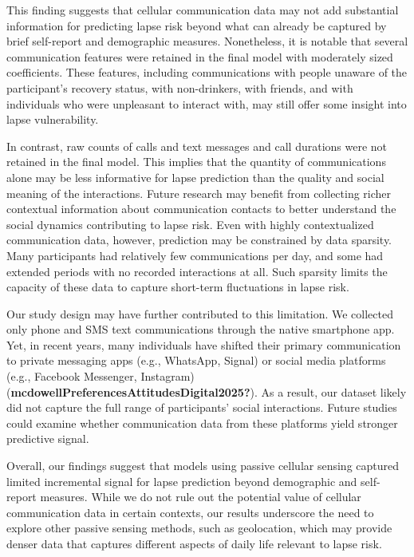 \documentclass[
  letterpaper,
  DIV=11,
  numbers=noendperiod]{scrartcl}
\begin{document}
This finding suggests that cellular communication data may not add
substantial information for predicting lapse risk beyond what can
already be captured by brief self-report and demographic measures.
Nonetheless, it is notable that several communication features were
retained in the final model with moderately sized coefficients. These
features, including communications with people unaware of the
participant's recovery status, with non-drinkers, with friends, and with
individuals who were unpleasant to interact with, may still offer some
insight into lapse vulnerability.

In contrast, raw counts of calls and text messages and call durations
were not retained in the final model. This implies that the quantity of
communications alone may be less informative for lapse prediction than
the quality and social meaning of the interactions. Future research may
benefit from collecting richer contextual information about
communication contacts to better understand the social dynamics
contributing to lapse risk. Even with highly contextualized
communication data, however, prediction may be constrained by data
sparsity. Many participants had relatively few communications per day,
and some had extended periods with no recorded interactions at all. Such
sparsity limits the capacity of these data to capture short-term
fluctuations in lapse risk.

Our study design may have further contributed to this limitation. We
collected only phone and SMS text communications through the native
smartphone app. Yet, in recent years, many individuals have shifted
their primary communication to private messaging apps (e.g., WhatsApp,
Signal) or social media platforms (e.g., Facebook Messenger, Instagram)
(\textbf{mcdowellPreferencesAttitudesDigital2025?}). As a result, our
dataset likely did not capture the full range of participants' social
interactions. Future studies could examine whether communication data
from these platforms yield stronger predictive signal.

Overall, our findings suggest that models using passive cellular sensing
captured limited incremental signal for lapse prediction beyond
demographic and self-report measures. While we do not rule out the
potential value of cellular communication data in certain contexts, our
results underscore the need to explore other passive sensing methods,
such as geolocation, which may provide denser data that captures
different aspects of daily life relevant to lapse risk.

\newpage
\end{document}
